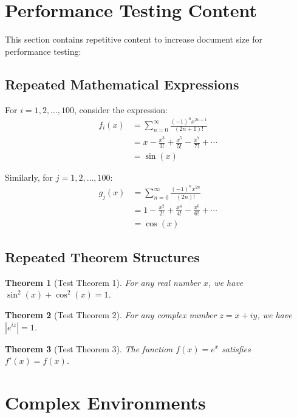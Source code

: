 \documentclass[12pt]{article}
\newtheorem{theorem}{Theorem}
\begin{document}
\section{Performance Testing Content}

This section contains repetitive content to increase document size for performance testing:

\subsection{Repeated Mathematical Expressions}

For $i = 1, 2, \ldots, 100$, consider the expression:
\begin{align}
f_i(x) &= \sum_{n=0}^{\infty} \frac{(-1)^n x^{2n+1}}{(2n+1)!} \\
&= x - \frac{x^3}{3!} + \frac{x^5}{5!} - \frac{x^7}{7!} + \cdots \\
&= \sin(x)
\end{align}

Similarly, for $j = 1, 2, \ldots, 100$:
\begin{align}
g_j(x) &= \sum_{n=0}^{\infty} \frac{(-1)^n x^{2n}}{(2n)!} \\
&= 1 - \frac{x^2}{2!} + \frac{x^4}{4!} - \frac{x^6}{6!} + \cdots \\
&= \cos(x)
\end{align}

\subsection{Repeated Theorem Structures}

\begin{theorem}[Test Theorem 1]
For any real number $x$, we have $\sin^2(x) + \cos^2(x) = 1$.
\end{theorem}

\begin{theorem}[Test Theorem 2]
For any complex number $z = x + iy$, we have $|e^{iz}| = 1$.
\end{theorem}

\begin{theorem}[Test Theorem 3]
The function $f(x) = e^x$ satisfies $f'(x) = f(x)$.
\end{theorem}

\section{Complex Environments}
\end{document}
